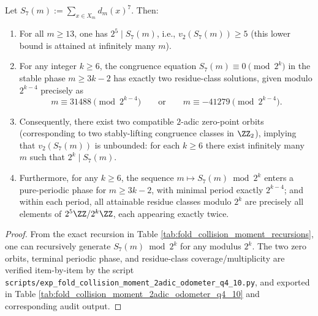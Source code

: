 \begin{conclusion}[The \(2\)-adic Two-Root Phenomenon for \texorpdfstring{$q=7$}{q=7}: Two \(2\)-adic Conjugate Zero Orbits Precisely Characterize High-Order Divisibility]\label{con:pom-s7-2adic-two-root-zero-orbits}
Let \(S_7(m):=\sum_{x\in X_m} d_m(x)^7\).
Then:
\begin{enumerate}
  \item For all \(m\ge 13\), one has \(2^5\mid S_7(m)\), i.e., \(v_2(S_7(m))\ge 5\) (this lower bound is attained at infinitely many \(m\)).
  \item For any integer \(k\ge 6\), the congruence equation \(S_7(m)\equiv 0\pmod{2^k}\) in the stable phase \(m\ge 3k-2\) has exactly two residue-class solutions, given modulo \(2^{k-4}\) precisely as
  \[
  m\equiv 31488\pmod{2^{k-4}}
  \qquad\text{or}\qquad
  m\equiv -41279\pmod{2^{k-4}}.
  \]
  \item Consequently, there exist two compatible \(2\)-adic zero-point orbits (corresponding to two stably-lifting congruence classes in \(\ZZ_2\)), implying that \(v_2(S_7(m))\) is unbounded: for each \(k\ge 6\) there exist infinitely many \(m\) such that \(2^k\mid S_7(m)\).
  \item Furthermore, for any \(k\ge 6\), the sequence \(m\mapsto S_7(m)\bmod 2^k\) enters a pure-periodic phase for \(m\ge 3k-2\), with minimal period exactly \(2^{k-4}\);
  and within each period, all attainable residue classes modulo \(2^k\) are precisely all elements of \(2^5\ZZ/2^k\ZZ\), each appearing exactly twice.
\end{enumerate}
\end{conclusion}
\begin{proof}
From the exact recursion in Table \ref{tab:fold_collision_moment_recursions}, one can recursively generate \(S_7(m)\bmod 2^k\) for any modulus \(2^k\).
The two zero orbits, terminal periodic phase, and residue-class coverage/multiplicity are verified item-by-item by the script \texttt{scripts/exp\_fold\_collision\_moment\_2adic\_odometer\_q4\_10.py}, and exported in Table \ref{tab:fold_collision_moment_2adic_odometer_q4_10} and corresponding audit output.
\end{proof}
